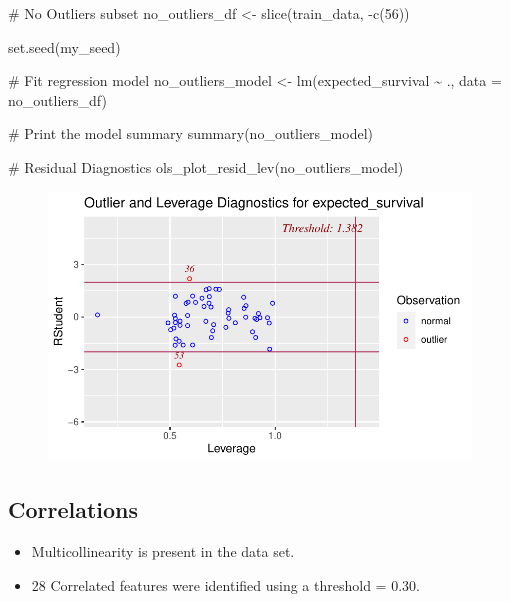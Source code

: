 \documentclass[
  letterpaper,
  DIV=11,
  numbers=noendperiod]{scrreprt}
\newenvironment{Shaded}{\begin{snugshade}}{\end{snugshade}}
\newcommand{\AttributeTok}[1]{\textcolor[rgb]{0.40,0.45,0.13}{#1}}
\newcommand{\CommentTok}[1]{\textcolor[rgb]{0.37,0.37,0.37}{#1}}
\newcommand{\DecValTok}[1]{\textcolor[rgb]{0.68,0.00,0.00}{#1}}
\newcommand{\FunctionTok}[1]{\textcolor[rgb]{0.28,0.35,0.67}{#1}}
\newcommand{\NormalTok}[1]{\textcolor[rgb]{0.00,0.23,0.31}{#1}}
\newcommand{\OtherTok}[1]{\textcolor[rgb]{0.00,0.23,0.31}{#1}}
\newcommand{\SpecialCharTok}[1]{\textcolor[rgb]{0.37,0.37,0.37}{#1}}
\begin{document}
\begin{Shaded}
\begin{Highlighting}[]
\CommentTok{\# No Outliers subset}
\NormalTok{no\_outliers\_df }\OtherTok{\textless{}{-}} \FunctionTok{slice}\NormalTok{(train\_data, }\SpecialCharTok{{-}}\FunctionTok{c}\NormalTok{(}\DecValTok{56}\NormalTok{))}

\FunctionTok{set.seed}\NormalTok{(my\_seed)}

\CommentTok{\# Fit regression model}
\NormalTok{no\_outliers\_model }\OtherTok{\textless{}{-}} \FunctionTok{lm}\NormalTok{(expected\_survival }\SpecialCharTok{\textasciitilde{}}\NormalTok{ ., }\AttributeTok{data =}\NormalTok{ no\_outliers\_df)}

\CommentTok{\# Print the model summary}
\FunctionTok{summary}\NormalTok{(no\_outliers\_model)}

\CommentTok{\# Residual Diagnostics}
\FunctionTok{ols\_plot\_resid\_lev}\NormalTok{(no\_outliers\_model)}
\end{Highlighting}
\end{Shaded}

\begin{figure}[H]

{\centering \includegraphics{analysis_files/figure-pdf/unnamed-chunk-12-1.pdf}

}

\end{figure}

\hypertarget{correlations}{%
\subsection{Correlations}\label{correlations}}

\begin{itemize}
\item
  Multicollinearity is present in the data set.
\item
  28 Correlated features were identified using a threshold = 0.30.
\end{itemize}
\end{document}
